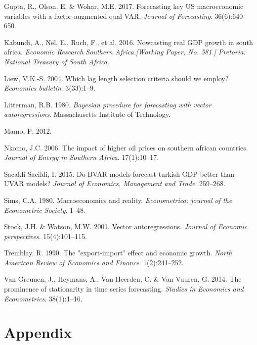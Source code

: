 \documentclass[11pt,preprint, authoryear]{elsarticle}
\numberwithin{equation}{section}
\numberwithin{figure}{section}
\numberwithin{table}{section}
\newlength{\cslhangindent}
\newenvironment{CSLReferences}%
  {\setlength{\parindent}{0pt}%
  \everypar{\setlength{\hangindent}{\cslhangindent}}\ignorespaces}%
  {\par}
\begin{document}
\begin{CSLReferences}{1}{0}
\leavevmode{}%
Gupta, R., Olson, E. \& Wohar, M.E. 2017. Forecasting key US
macroeconomic variables with a factor-augmented qual VAR. \emph{Journal
of Forecasting}. 36(6):640--650.

\leavevmode{}%
Kabundi, A., Nel, E., Ruch, F., et al. 2016. Nowcasting real GDP growth
in south africa. \emph{Economic Research Southern Africa.{[}Working
Paper, No. 581.{]} Pretoria: National Treasury of South Africa}.

\leavevmode{}%
Liew, V.K.-S. 2004. Which lag length selection criteria should we
employ? \emph{Economics bulletin}. 3(33):1--9.

\leavevmode{}%
Litterman, R.B. 1980. \emph{Bayesian procedure for forecasting with
vector autoregressions}. Massachusetts Institute of Technology.

\leavevmode{}%
Mamo, F. 2012.

\leavevmode{}%
Nkomo, J.C. 2006. The impact of higher oil prices on southern african
countries. \emph{Journal of Energy in Southern Africa}. 17(1):10--17.

\leavevmode{}%
Sacakli-Sacildi, I. 2015. Do BVAR models forecast turkish GDP better
than UVAR models? \emph{Journal of Economics, Management and Trade}.
259--268.

\leavevmode{}%
Sims, C.A. 1980. Macroeconomics and reality. \emph{Econometrica: journal
of the Econometric Society}. 1--48.

\leavevmode{}%
Stock, J.H. \& Watson, M.W. 2001. Vector autoregressions. \emph{Journal
of Economic perspectives}. 15(4):101--115.

\leavevmode{}%
Tremblay, R. 1990. The "export-import" effect and economic growth.
\emph{North American Review of Economics and Finance}. 1(2):241--252.

\leavevmode{}%
Van Greunen, J., Heymans, A., Van Heerden, C. \& Van Vuuren, G. 2014.
The prominence of stationarity in time series forecasting. \emph{Studies
in Economics and Econometrics}. 38(1):1--16.

\end{CSLReferences}

\hypertarget{appendix}{%
\section*{Appendix}\label{appendix}}
\end{document}
